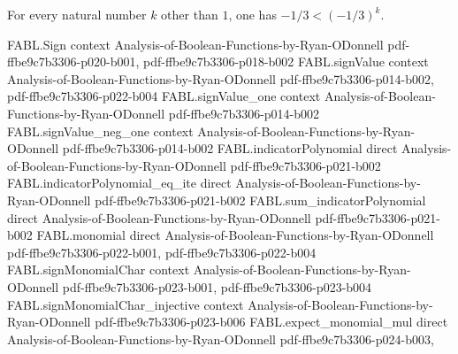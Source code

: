 \begin{theorem}
\label{FABL.neg_one_third_lt_pow_of_ne_one}
\leanok
{}
For every natural number $k$ other than $1$, one has $-1/3 < (-1/3)^k$.
\end{theorem}

\begin{theorem}
\label{FABL.fourierWeightAtLevel_one_eq_one_of_noiseStability_neg_one_third}
\leanok
{}
\proofstep
  {FABL.Sign}
  {context}
  {Analysis-of-Boolean-Functions-by-Ryan-ODonnell}
  {pdf-ffbe9c7b3306-p020-b001,
    pdf-ffbe9c7b3306-p018-b002}
\proofstep
  {FABL.signValue}
  {context}
  {Analysis-of-Boolean-Functions-by-Ryan-ODonnell}
  {pdf-ffbe9c7b3306-p014-b002,
    pdf-ffbe9c7b3306-p022-b004}
\proofstep
  {FABL.signValue_one}
  {context}
  {Analysis-of-Boolean-Functions-by-Ryan-ODonnell}
  {pdf-ffbe9c7b3306-p014-b002}
\proofstep
  {FABL.signValue_neg_one}
  {context}
  {Analysis-of-Boolean-Functions-by-Ryan-ODonnell}
  {pdf-ffbe9c7b3306-p014-b002}
\proofstep
  {FABL.indicatorPolynomial}
  {direct}
  {Analysis-of-Boolean-Functions-by-Ryan-ODonnell}
  {pdf-ffbe9c7b3306-p021-b002}
\proofstep
  {FABL.indicatorPolynomial_eq_ite}
  {direct}
  {Analysis-of-Boolean-Functions-by-Ryan-ODonnell}
  {pdf-ffbe9c7b3306-p021-b002}
\proofstep
  {FABL.sum_indicatorPolynomial}
  {direct}
  {Analysis-of-Boolean-Functions-by-Ryan-ODonnell}
  {pdf-ffbe9c7b3306-p021-b002}
\proofstep
  {FABL.monomial}
  {direct}
  {Analysis-of-Boolean-Functions-by-Ryan-ODonnell}
  {pdf-ffbe9c7b3306-p022-b001,
    pdf-ffbe9c7b3306-p022-b004}
\proofstep
  {FABL.signMonomialChar}
  {context}
  {Analysis-of-Boolean-Functions-by-Ryan-ODonnell}
  {pdf-ffbe9c7b3306-p023-b001,
    pdf-ffbe9c7b3306-p023-b004}
\proofstep
  {FABL.signMonomialChar_injective}
  {context}
  {Analysis-of-Boolean-Functions-by-Ryan-ODonnell}
  {pdf-ffbe9c7b3306-p023-b006}
\proofstep
  {FABL.expect_monomial_mul}
  {direct}
  {Analysis-of-Boolean-Functions-by-Ryan-ODonnell}
  {pdf-ffbe9c7b3306-p024-b003,
}
\end{theorem}
